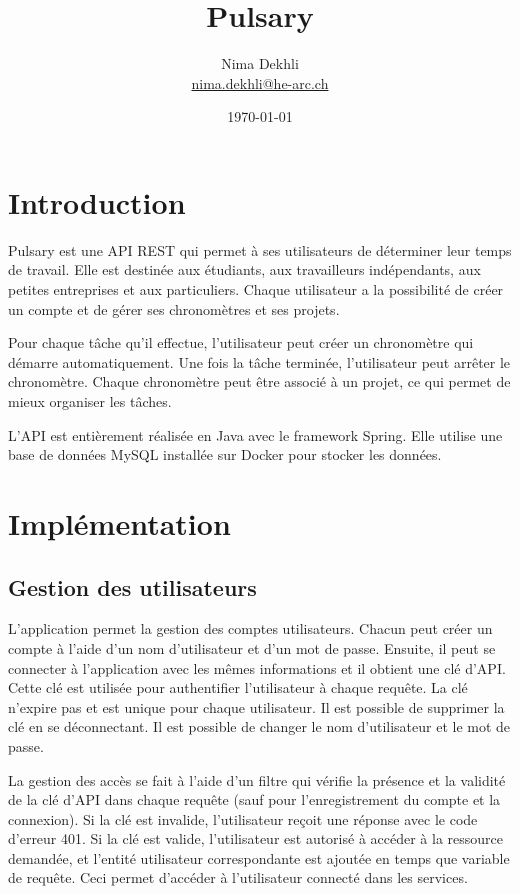 \documentclass[
  french,
  a4paper,
]{scrartcl}
\title{Pulsary}
\author{Nima Dekhli\\
    \small \href{mailto:nima.dekhli@he-arc.ch}{nima.dekhli@he-arc.ch}}
\date{\today}
\begin{document}
\maketitle
\tableofcontents

\section{Introduction}

Pulsary est une API REST qui permet à ses utilisateurs de déterminer 
leur temps de travail. Elle est destinée aux étudiants, aux travailleurs 
indépendants, aux petites entreprises et aux particuliers. Chaque utilisateur 
a la possibilité de créer un compte et de gérer ses chronomètres et ses projets.

Pour chaque tâche qu'il effectue, l'utilisateur peut créer un chronomètre 
qui démarre automatiquement. Une fois la tâche terminée, l'utilisateur 
peut arrêter le chronomètre. Chaque chronomètre peut être associé à un projet, 
ce qui permet de mieux organiser les tâches.

L'API est entièrement réalisée en Java avec le framework Spring. 
Elle utilise une base de données MySQL installée sur Docker pour stocker les données.


\section{Implémentation}

\subsection{Gestion des utilisateurs}

L'application permet la gestion des comptes utilisateurs. 
Chacun peut créer un compte à l'aide d'un nom d'utilisateur et d'un mot de passe. 
Ensuite, il peut se connecter à l'application avec les mêmes informations et 
il obtient une clé d'API. Cette clé est utilisée pour authentifier l'utilisateur
à chaque requête. La clé n'expire pas et est unique pour chaque utilisateur. 
Il est possible de supprimer la clé en se déconnectant. 
Il est possible de changer le nom d'utilisateur et le mot de passe. 

La gestion des accès se fait à l'aide d'un filtre qui vérifie la présence  
et la validité de la clé d'API dans chaque requête (sauf pour l'enregistrement 
du compte et la connexion). Si la clé est invalide, l'utilisateur reçoit une
réponse avec le code d'erreur 401. Si la clé est valide, l'utilisateur est
autorisé à accéder à la ressource demandée, et l'entité utilisateur correspondante 
est ajoutée en temps que variable de requête. Ceci permet d'accéder à l'utilisateur
connecté dans les services. 
\end{document}
